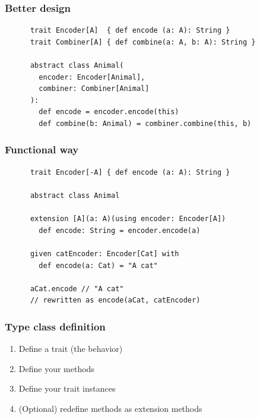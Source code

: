 \begin{frame}[fragile]
  \frametitle{Better design}

  \begin{example}[Composition]
    \begin{lstlisting}
      trait Encoder[A]  { def encode (a: A): String }
      trait Combiner[A] { def combine(a: A, b: A): String }

      abstract class Animal(
        encoder: Encoder[Animal],
        combiner: Combiner[Animal]
      ):
        def encode = encoder.encode(this)
        def combine(b: Animal) = combiner.combine(this, b)
    \end{lstlisting}
  \end{example}
\end{frame}

\begin{frame}[fragile]
  \frametitle{Functional way}

  \begin{example}
    \begin{lstlisting}
      trait Encoder[-A] { def encode (a: A): String }

      abstract class Animal

      extension [A](a: A)(using encoder: Encoder[A])
        def encode: String = encoder.encode(a)

      given catEncoder: Encoder[Cat] with
        def encode(a: Cat) = "A cat"

      aCat.encode // "A cat"
      // rewritten as encode(aCat, catEncoder)
    \end{lstlisting}
  \end{example}
\end{frame}

\begin{frame}
  \frametitle{Type class definition}

  \begin{enumerate}
    \item Define a trait (the behavior)
    \item Define your methods
    \item Define your trait instances
    \item (Optional) redefine methods as extension methods
  \end{enumerate}
\end{frame}


